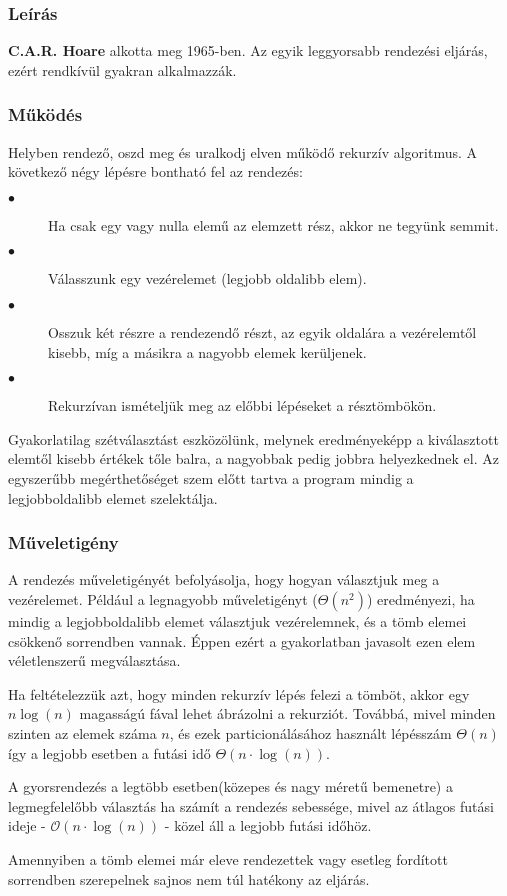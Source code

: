 \documentclass{elteikthesis}
\begin{document}
\subsubsection{Leírás}
\textbf{C.A.R. Hoare}\cite{Horae} alkotta meg 1965-ben. Az egyik leggyorsabb rendezési eljárás, ezért rendkívül gyakran alkalmazzák.
\subsubsection{Működés}
Helyben rendező, oszd meg és uralkodj\cite{Cormen} elven működő rekurzív algoritmus. A következő négy lépésre bontható fel az rendezés:
\begin{description}
	\item[$\bullet$] Ha csak egy vagy nulla elemű az elemzett rész, akkor ne tegyünk semmit.
	\item[$\bullet$] Válasszunk egy vezérelemet (legjobb oldalibb elem).
	\item[$\bullet$] Osszuk két részre a rendezendő részt, az egyik oldalára a vezérelemtől kisebb, míg a másikra a nagyobb elemek kerüljenek.
	\item[$\bullet$] Rekurzívan ismételjük meg az előbbi lépéseket a résztömbökön.
\end{description}
Gyakorlatilag szétválasztást eszközölünk, melynek eredményeképp a kiválasztott elemtől kisebb értékek tőle balra, a nagyobbak pedig jobbra helyezkednek el. Az egyszerűbb megérthetőséget szem előtt tartva a program mindig a legjobboldalibb elemet szelektálja.
\subsubsection{Műveletigény}
A rendezés műveletigényét befolyásolja, hogy hogyan választjuk meg a vezérelemet. Például a legnagyobb műveletigényt ($\Theta(n^2)$) eredményezi, ha mindig a legjobboldalibb elemet választjuk vezérelemnek, és a tömb elemei csökkenő sorrendben vannak\cite{Cormen}. Éppen ezért a gyakorlatban javasolt ezen elem véletlenszerű megválasztása.\par
Ha feltételezzük azt, hogy minden rekurzív lépés felezi a tömböt, akkor egy $n\log(n)$ magasságú fával lehet ábrázolni a rekurziót. Továbbá, mivel minden szinten az elemek száma $n$, és ezek particionálásához használt lépésszám $\Theta(n)$ így a legjobb esetben a futási idő $\Theta(n\cdot\log(n))$.\par
 A gyorsrendezés a legtöbb esetben(közepes és nagy méretű bemenetre) a legmegfelelőbb választás ha számít a rendezés sebessége, mivel az átlagos futási ideje - $\mathcal{O}(n\cdot\log(n))$ - közel áll a legjobb futási időhöz\cite{Cormen}.\par
 Amennyiben a tömb elemei már eleve rendezettek vagy esetleg fordított sorrendben szerepelnek sajnos nem túl hatékony az eljárás.
\end{document}
